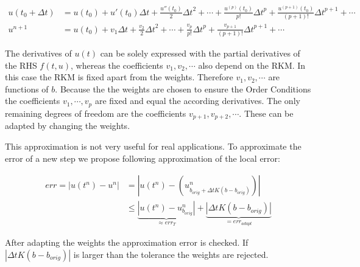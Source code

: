 \documentclass[a4paper]{scrartcl}
\numberwithin{equation}{section}
\theoremstyle{plain}
\theoremstyle{definition}
\numberwithin{theorem}{section}
\newcommand{\dt}{{\Delta t}}
\newcommand{\1}{\mathbbm{1}}
\begin{document}
\begin{align}\label{eq:Taylor_sol_ref}
u(t_0 + \dt) &= u(t_0) + u'(t_0) \dt + \frac{u''(t_0)}{2} \dt^2 + \cdots + \frac{u^{(p)}(t_0)}{p!} \dt^p + \frac{u^{(p+1)}(t_0)}{(p+1)!} \dt^{p+1} + \cdots \\
u^{n+1} &= u(t_0)  + v_1 \dt + \frac{v_2}{2} \dt^2 + \cdots + \frac{v_p}{p!} \dt^p + \frac{v_{p+1}}{(p+1)!} \dt^{p+1} + \cdots 
\end{align}

The derivatives of $u(t)$ can be solely expressed with the partial derivatives of the RHS $f(t,u)$, whereas the coefficients $v_1,v_2,\cdots$ also depend on the RKM. 
In this case the RKM is fixed apart from the weights. 
Therefore $v_1,v_2,\cdots$ are functions of $b$.
Because the the weights are chosen to ensure the Order Conditions the coefficients $v_1,\cdots,v_p$ are fixed and equal the according derivatives. 
The only remaining degrees of freedom are the coefficients $v_{p+1},v_{p+2},\cdots$.
These can be adapted by changing the weights.

This approximation is not very useful for real applications. 
To approximate the error of a new step we propose following approximation of the local error:

\begin{align}
err = |u(t^n)-u^n| &= |u(t^n) - (u^n_{b_{orig}+\dt K(b-b_{orig})})| \\
 &\leq \underbrace{|u(t^n)-u^n_{b_{orig}}|}_{\approx err_T}+\underbrace{|\dt K(b-b_{orig})|}_{= err_{adapt}}
\end{align}

After adapting the weights the approximation error is checked. If $|\dt K(b-b_{orig})|$ is larger than the tolerance the weights are rejected. 
\end{document}
